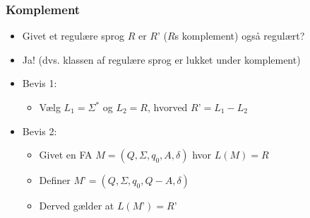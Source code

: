 \documentclass[]{beamer}
\begin{document}
\begin{frame}
  \frametitle{Komplement}
  \begin{itemize}
  \item          
Givet et regulære sprog $R$
er $R’$ ($R$s komplement) også regulært?
\item Ja! (dvs. klassen af regulære sprog er lukket under komplement)
\item Bevis 1:
\begin{itemize}
\item Vælg $L_1 = Σ^*$ og $L_2 = R$, hvorved $R’ = L_1-L_2$
\end{itemize}
\item Bevis 2:
\begin{itemize}
\item Givet en FA $M = (Q, Σ, q_0, A, δ)$ hvor $L(M)=R$
\item Definer $M’ = (Q, Σ, q_0, Q-A, δ)$
\item Derved gælder at $L(M’)=R’$ 
\end{itemize}
  \end{itemize}
\end{frame}
\end{document}
